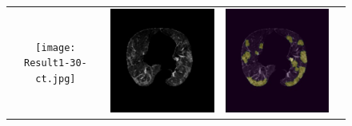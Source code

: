 \begin{figure}
\centering
\begin{tabular}{c c c c}
    \texttt{[image: Result1-30-ct.jpg]} & \!\!
    \includegraphics[scale=0.46]{images/Result1-30-extracted.jpg} & \!\!
    \includegraphics[scale=0.46]{images/Result1-30-unet.jpg} & \!\!

\end{tabular}
\end{figure}
